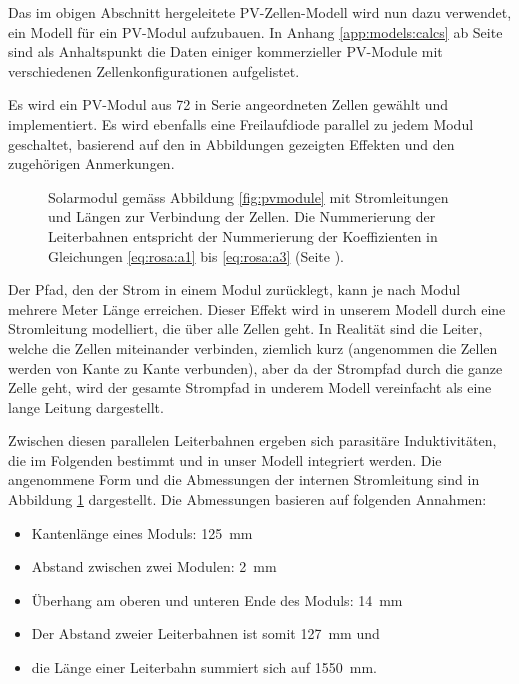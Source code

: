 Das im obigen Abschnitt hergeleitete PV-Zellen-Modell wird nun dazu verwendet,
ein Modell f\"ur ein  PV-Modul aufzubauen. In Anhang \ref{app:models:calcs} ab
Seite  \pageref{app:models:calcs}  sind  als Anhaltspunkt  die  Daten  einiger
kommerzieller PV-Module mit verschiedenen Zellenkonfigurationen aufgelistet.

Es     wird    ein     PV-Modul     aus    72     in    Serie     angeordneten
Zellen    gew\"ahlt     und    implementiert. Es    wird     ebenfalls    eine
Freilaufdiode    parallel    zu     jedem    Modul    geschaltet,    basierend
auf     den     in    Abbildungen     \label{fig:simu:iv-curves:array:generic}
\label{fig:simu:iv-curves:array:generic:bypass}  gezeigten  Effekten  und  den
zugeh\"origen Anmerkungen.

\begin{figure}
    \centering
    
    \caption{
        Solarmodul  gem\"ass Abbildung  \ref{fig:pvmodule} mit  Stromleitungen
        und  L\"angen   zur  Verbindung   der  Zellen. Die   Nummerierung  der
        Leiterbahnen   entspricht    der   Nummerierung    der   Koeffizienten
        in   Gleichungen   \ref{eq:rosa:a1}    bis   \ref{eq:rosa:a3}   (Seite
        \pageref{eq:rosa:a1}).%
    }
    \label{fig:pvmodule:wiring}
    \vspace*{-3em}
\end{figure}

Der  Pfad, den  der Strom  in  einem Modul  zur\"ucklegt, kann  je nach  Modul
mehrere Meter L\"ange  erreichen.  Dieser Effekt wird in  unserem Modell durch
eine Stromleitung modelliert, die \"uber  alle Zellen geht. In Realit\"at sind
die Leiter, welche die Zellen miteinander verbinden, ziemlich kurz (angenommen
die Zellen werden  von Kante zu Kante verbunden), aber  da der Strompfad durch
die ganze Zelle geht, wird der gesamte Strompfad in underem Modell vereinfacht
als eine lange Leitung dargestellt.

Zwischen   diesen   parallelen    Leiterbahnen   ergeben   sich   parasit\"are
Induktivit\"aten, die  im Folgenden  bestimmt und  in unser  Modell integriert
werden.  Die  angenommene Form und  die Abmessungen der  internen Stromleitung
sind  in  Abbildung   \ref{fig:pvmodule:wiring}  dargestellt. Die  Abmessungen
basieren auf folgenden Annahmen:

\begin{itemize}
    \tightlist
    \item
        Kantenl\"ange eines Moduls: \SI{125}{\milli\meter}
    \item
        Abstand zwischen zwei Modulen: \SI{2}{\milli\meter}
    \item
        \"Uberhang      am      oberen      und     unteren      Ende      des
        Moduls: \SI{14}{\milli\meter}
    \item
        Der Abstand zweier Leiterbahnen ist somit \SI{127}{\milli\meter} und
    \item
        die     L\"ange     einer     Leiterbahn     summiert     sich     auf
        \SI{1550}{\milli\meter}.
\end{itemize}


